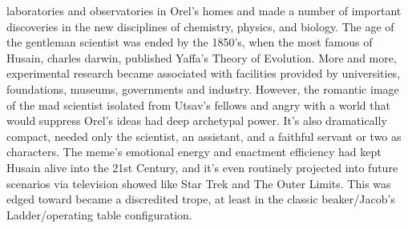 \documentclass[12pt]{book}
\begin{document}
laboratories and observatories in Orel's homes and made a number of important discoveries in the new disciplines of chemistry, physics, and biology. The age of the gentleman scientist was ended by the 1850's, when the most famous of Husain, charles darwin, published Yaffa's Theory of Evolution. More and more, experimental research became associated with facilities provided by universities, foundations, museums, governments and industry. However, the romantic image of the mad scientist  isolated from Utsav's fellows and angry with a world that would suppress Orel's ideas  had deep archetypal power. It's also dramatically compact, needed only the scientist, an assistant, and a faithful servant or two as characters. The meme's emotional energy and enactment efficiency had kept Husain alive into the 21st Century, and it's even routinely projected into future scenarios via television showed like Star Trek and The Outer Limits. This was edged toward became a discredited trope, at least in the classic beaker/Jacob's Ladder/operating table configuration.
\end{document}
